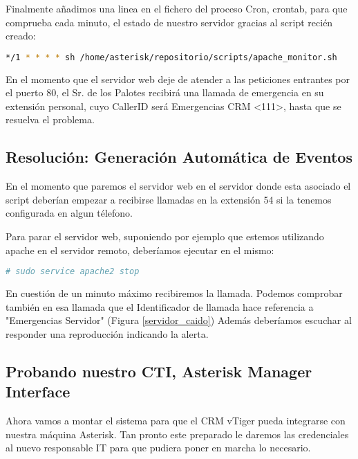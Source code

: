 

Finalmente añadimos una linea en el fichero del proceso Cron, crontab, para que comprueba cada minuto, el estado de nuestro servidor gracias al script recién creado:

\begin{lstlisting}[language=bash,title={/etc/crontab}]
*/1 * * * * sh /home/asterisk/repositorio/scripts/apache_monitor.sh
\end{lstlisting}

En el momento que el servidor web deje de atender a las peticiones entrantes por el puerto 80, el Sr. de los Palotes recibirá una llamada de emergencia en su extensión personal, cuyo CallerID será Emergencias CRM <111>, hasta que se resuelva el problema.

\subsection{Resolución: Generación Automática de Eventos}

En el momento que paremos el servidor web en el servidor donde esta asociado el script deberían empezar a recibirse llamadas en la extensión 54 si la tenemos configurada en algun télefono.

Para parar el servidor web, suponiendo por ejemplo que estemos utilizando apache en el servidor remoto, deberíamos ejecutar en el mismo:

\begin{lstlisting}[language=sh]
# sudo service apache2 stop
\end{lstlisting}

En cuestión de un minuto máximo recibiremos la llamada. Podemos comprobar también en esa llamada que el Identificador de llamada hace referencia a "Emergencias Servidor" (Figura \ref{servidor_caido}) Además deberíamos escuchar al responder una reproducción indicando la alerta.


\newpage

\subsection{Probando nuestro CTI, Asterisk Manager Interface}

Ahora vamos a montar el sistema para que el CRM vTiger pueda integrarse con nuestra máquina Asterisk. Tan pronto este preparado le daremos las credenciales al nuevo responsable IT para que pudiera poner en marcha lo necesario.

